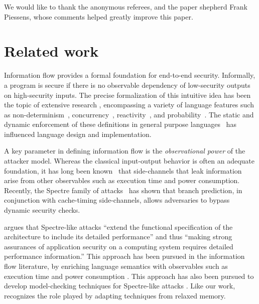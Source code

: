 We would like to thank the anonymous referees,
and the paper shepherd Frank Piessens, whose
comments helped greatly improve this paper.

\section{Related work}

Information flow provides a formal
foundation for end-to-end security.  Informally, a program is secure
if there is no observable dependency of low-security outputs on high-security inputs.
The precise formalization of this intuitive idea has been the topic of
extensive research \cite{Sabelfeld:2006:LIS:2312191.2314769}, encompassing a variety of language
features such as non-determinism~\cite{Wittbold1990InformationFI},
concurrency~\cite{Smith:1998:SIF:268946.268975}, reactivity~\cite{O'Neill:2006:ISI:1155442.1155677}, and
probability~\cite{Gray:1992:TMF:2699806.2699811}. The static and dynamic enforcement
of these definitions in general purpose languages~\cite{myers-popl99} has %
influenced language design and implementation.

A key parameter in defining information flow is the \emph{observational power} of the attacker model. Whereas the classical
input-output behavior is often an adequate foundation,
it has long been known~\cite{Lampson:1973:NCP:362375.362389,Biswas:2017:STC:3058791.3023872} that side-channels that leak
information arise from other observables such as execution time and
power consumption.
Recently, the Spectre family of attacks~\cite{DBLP:journals/corr/abs-1801-01203} has
shown that branch prediction, in conjunction with cache-timing side-channels,
allows adversaries to bypass dynamic security checks.

\citet{Chien:2018} argues that Spectre-like attacks ``extend the functional
specification of the architecture to include its detailed performance'' and
thus ``making strong assurances of application security on a computing system
requires detailed performance information.''
This approach has been pursued in the information flow literature, by
enriching language semantics with observables such as execution time and  power consumption
\cite{Zhang:2012:LCM:2345156.2254078,hyperflow}.   This approach
has also been pursued to develop model-checking techniques for Spectre-like
attacks \cite{DBLP:conf/micro/TrippelLM18}.  Like our work,
\cite{DBLP:conf/micro/TrippelLM18} recognizes the role played by adapting
techniques from relaxed memory.

